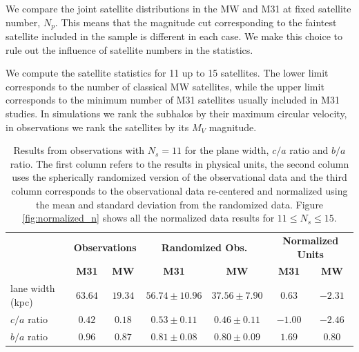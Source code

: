\documentclass[a4paper,fleqn,usenatbib]{mnras}
\begin{document}
We compare the joint satellite distributions in the MW and M31 at fixed
satellite number, $N_p$.
This means that the magnitude cut corresponding to the faintest
satellite included in the sample is different in each case.
We make this choice to rule out the influence of satellite numbers
in the statistics. 

We compute the satellite statistics for 11 up to 15 satellites.
The lower limit corresponds to the number of classical MW satellites,
while the upper limit corresponds to the minimum number of M31
satellites usually included in M31 studies.
In simulations we rank the subhalos by their maximum circular
velocity, in observations we rank the satellites by its $M_V$
magnitude.  


\begin{table}
  \centering
  \renewcommand{\arraystretch}{1.2}
  \begin{tabular}{|p{2.5cm}|c|c|c|c|c|c|}
    \hline
    \multirow{2}{4.0cm}{} & \multicolumn{2}{c|}{\textbf{Observations}}
    & \multicolumn{2}{c|}{\textbf{Randomized Obs.}} &
    \multicolumn{2}{c|}{\textbf{Normalized Units}}\\
    \cline{2-7}
    & \textbf{M31} & \textbf{MW} & \textbf{M31} & \textbf{MW} & \textbf{M31} & \textbf{MW} \\
    \hline
lane width (kpc) & $63.64$ & $19.34$ & $56.74\pm10.96$ & $37.56\pm7.90$ & $0.63$ & $-2.31$\\\hline
$c/a$ ratio & $0.42$ & $0.18$ & $0.53\pm0.11$ & $0.46\pm0.11$ & $-1.00$ & $-2.46$\\\hline
$b/a$ ratio & $0.96$ & $0.87$ & $0.81\pm0.08$ & $0.80\pm0.09$ & $1.69$ & $0.80$\\\hline
  \end{tabular}
  \caption{Results from observations with $N_s=11$ for the plane width, $c/a$
    ratio and $b/a$ ratio. 
    The first column refers to the results in physical units, the
    second column uses the spherically  randomized version of the 
    observational data and the third column corresponds to the
    observational data re-centered and normalized using the mean and standard
    deviation from the randomized data. Figure \ref{fig:normalized_n}
    shows all the normalized data results for $11\leq N_s\leq
    15$\label{table:observations}.}  
\end{table}
\end{document}
